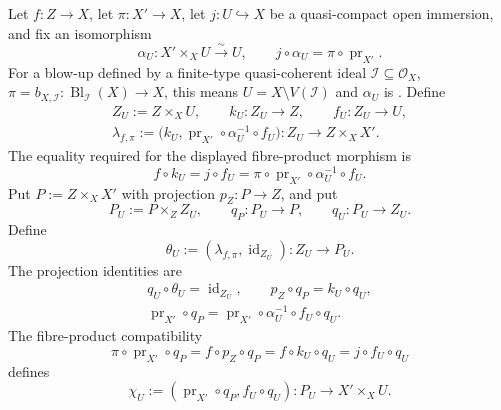\begin{definition}
  \label{def:nagata-strict-transform}

  Let $f\colon Z\to X$, let $\pi\colon X'\to X$, let
  $j\colon U\hookrightarrow X$ be a quasi-compact open immersion, and fix
  an isomorphism
  \[
    \alpha_U\colon X'\times_XU\xrightarrow{\sim}U,\qquad
    j\circ\alpha_U=\pi\circ\operatorname{pr}_{X'}.
  \]
  For a blow-up defined by a finite-type quasi-coherent ideal
  $\mathcal I\subseteq\mathcal O_X$,
  $\pi=b_{X,\mathcal I}\colon\operatorname{Bl}_{\mathcal I}(X)\to X$, this
  means $U=X\setminus V(\mathcal I)$ and $\alpha_U$ is
  .  Define
  \[
  \begin{gathered}
    Z_U:=Z\times_XU,\qquad
    k_U\colon Z_U\longrightarrow Z,\qquad
    f_U\colon Z_U\longrightarrow U,\\
    \lambda_{f,\pi}
      :=\bigl(k_U,
        \operatorname{pr}_{X'}\circ\alpha_U^{-1}\circ f_U\bigr)
      \colon Z_U\longrightarrow Z\times_XX'.
  \end{gathered}
  \]
  The equality required for the displayed fibre-product morphism is
  \[
    f\circ k_U
      =j\circ f_U
      =\pi\circ\operatorname{pr}_{X'}\circ\alpha_U^{-1}\circ f_U.
  \]
  Put $P:=Z\times_XX'$ with projection
  $p_Z\colon P\to Z$, and put
  \[
    P_U:=P\times_ZZ_U,
    \qquad
    q_P\colon P_U\to P,
    \qquad
    q_U\colon P_U\to Z_U.
  \]
  Define
  \[
    \theta_U:=(\lambda_{f,\pi},\operatorname{id}_{Z_U})
      \colon Z_U\longrightarrow P_U.
  \]
  The projection identities are
  \[
  \begin{gathered}
    q_U\circ\theta_U=\operatorname{id}_{Z_U},
    \qquad
    p_Z\circ q_P=k_U\circ q_U,\\
    \operatorname{pr}_{X'}\circ q_P
      =\operatorname{pr}_{X'}\circ\alpha_U^{-1}\circ f_U\circ q_U.
  \end{gathered}
  \]
  The fibre-product compatibility
  \[
    \pi\circ\operatorname{pr}_{X'}\circ q_P
      =f\circ p_Z\circ q_P
      =f\circ k_U\circ q_U
      =j\circ f_U\circ q_U
  \]
  defines
  \[
    \chi_U:=
      (\operatorname{pr}_{X'}\circ q_P,f_U\circ q_U)
      \colon P_U\longrightarrow X'\times_XU.
\]
\end{definition}
